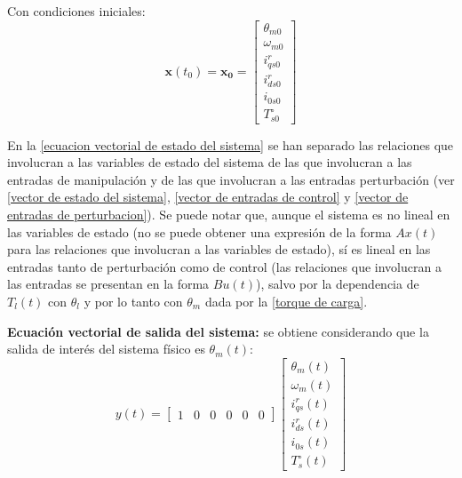 \documentclass[a4paper, 10pt, onecolumn,journal]{ieeeconf}
\begin{document}
Con condiciones iniciales:
\begin{equation}
    \mathbf{x}(t_0) = \mathbf{x_0}
    =
    \begin{bmatrix} 
        \theta_{m0} \\ 
        \omega_{m0} \\ 
        i^r_{qs0} \\ 
        i^r_{ds0} \\ 
        i_{0s0} \\ 
        T^\circ_{s0} 
    \end{bmatrix}
\end{equation}

En la \cref{ecuacion vectorial de estado del sistema} se han separado
las relaciones que involucran a las variables de estado del sistema de las que involucran a las 
entradas de manipulación y de las que involucran a las entradas perturbación (ver \cref{vector de estado del sistema}, \cref{vector de entradas de control} y \cref{vector de entradas de perturbacion}). Se puede notar
que, aunque el sistema es no lineal en las variables de estado (no se puede obtener una expresión de la forma $Ax(t)$ para las relaciones que involucran a las variables de estado), 
sí es lineal en las entradas tanto de perturbación como de control (las relaciones que involucran a las entradas se presentan en la forma $Bu(t)$), salvo por la dependencia de $T_l(t)$ con $\theta_l$ y por lo tanto con $\theta_m$ 
dada por la \cref{torque de carga}.

\textbf{Ecuación vectorial de salida del sistema:} se obtiene considerando que la salida de interés del sistema físico es $\theta_m(t)$:
\begin{equation}
    y(t) = 
    \begin{bmatrix}
        1 & 0 & 0 & 0 & 0 & 0
    \end{bmatrix}
    \begin{bmatrix} \theta_m(t) \\ \omega_m(t) \\ i^r_{qs}(t) \\ i^r_{ds}(t) \\ i_{0s}(t) \\ T^\circ_s(t) \end{bmatrix}
    \label{ecuacion vectorial de salida del sistema}
\end{equation}
\end{document}
